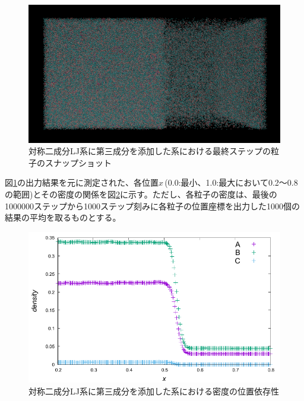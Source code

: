 \documentclass[titlepage]{jsreport}
\begin{document}
\begin{figure}[htbp]
    \begin{center}
        \includegraphics[width=14cm]{fig/lan278176-lbn417263-lcn7025-ran7782-rbn11673-rcn197/lan278176-lbn417263-lcn7025-ran7782-rbn11673-rcn197-last.png}
    \end{center}
    \caption{対称二成分LJ系に第三成分を添加した系における最終ステップの粒子のスナップショット}
    \label{fig:bi-component-addition-of-3rd-component-highest-purity-sample}
\end{figure}

図\ref{fig:bi-component-addition-of-3rd-component-highest-purity-sample}の出力結果を元に測定された、各位置$x$\,(0.0:最小、1.0:最大において0.2〜0.8の範囲)とその密度の関係を図\ref{fig:lan278176-lbn417263-lcn7025-ran7782-rbn11673-rcn197}に示す。ただし、各粒子の密度は、最後の1000000ステップから1000ステップ刻みに各粒子の位置座標を出力した1000個の結果の平均を取るものとする。

\begin{figure}[htbp]
    \begin{center}
        \includegraphics[width=14cm]{fig/lan278176-lbn417263-lcn7025-ran7782-rbn11673-rcn197/lan278176-lbn417263-lcn7025-ran7782-rbn11673-rcn197.pdf}
    \end{center}
    \caption{対称二成分LJ系に第三成分を添加した系における密度の位置依存性}
    \label{fig:lan278176-lbn417263-lcn7025-ran7782-rbn11673-rcn197}
\end{figure}
\end{document}
